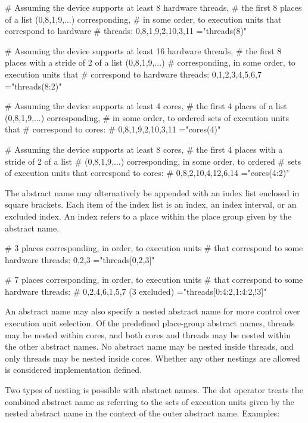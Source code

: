 \begin{boxeducode}
# Assuming the device supports at least 8 hardware threads,
# the first 8 places of a list (0,8,1,9,...) corresponding,
# in some order, to execution units that correspond to hardware
# threads: 0,8,1,9,2,10,3,11
="threads(8)"

# Assuming the device supports at least 16 hardware threads,
# the first 8 places with a stride of 2 of a list (0,8,1,9,...)
# corresponding, in some order, to execution units that
# correspond to hardware threads: 0,1,2,3,4,5,6,7
="threads(8:2)"

# Assuming the device supports at least 4 cores,
# the first 4 places of a list ({0,8},{1,9},...) corresponding,
# in some order, to ordered sets of execution units that
# correspond to cores:
# {0,8},{1,9},{2,10},{3,11}
="cores(4)"

# Assuming the device supports at least 8 cores,
# the first 4 places with a stride of 2 of a list
# ({0,8},{1,9},...) corresponding, in some order, to ordered
# sets of execution units that correspond to cores:
# {0,8},{2,10},{4,12},{6,14}
="cores(4:2)"
\end{boxeducode}

The abstract name may alternatively be appended with an index list enclosed in
square brackets. Each item of the index list is an index, an index interval, or
an excluded index. An index refers to a place within the place group given by
the abstract name.

\begin{boxeducode}
# 3 places corresponding, in order, to execution units
# that correspond to some hardware threads: 0,2,3
="threads[0,2,3]"

# 7 places corresponding, in order, to execution units
# that correspond to some hardware threads:
# 0,2,4,6,1,5,7 (3 excluded)
="threads[0:4:2,1:4:2,!3]"
\end{boxeducode}

An abstract name may also specify a nested abstract name for more control over
execution unit selection. Of the predefined place-group abstract names, threads
may be nested within cores, and both cores and threads may be nested within the
other abstract names. No abstract name may be nested inside threads, and only
threads may be nested inside cores. Whether any other nestings are allowed is
considered implementation defined.

Two types of nesting is possible with abstract names. The dot operator
 treats the combined abstract name as referring to the sets of
execution units given by the nested abstract name in the context of the outer
abstract name. Examples:

